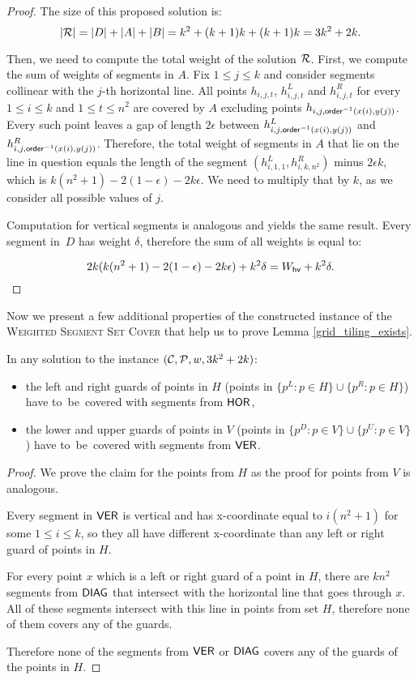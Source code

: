 \begin{proof}
The size of this proposed solution is:
$$|\mathcal{R}| = |D| + |A| + |B| = k^2 + (k+1)k + (k+1)k = 3k^2+2k.$$

Then, we need to compute the total weight of the solution $\mathcal{R}$.
First, we compute the sum of weights of segments in $A$.
Fix $1 \le j \le k$ and consider segments collinear
with the $j$-th horizontal line.
All points $h_{i,j,t}$, $h_{i,j,t}^L$ and $h_{i,j,t}^R$
for every $1 \le i \le k$ and $1 \le t \le n^2$ are covered by $A$
excluding points $h_{i,j,\mathsf{order}^{-1}(x(i),y(j))}$.
Every such point leaves a gap of length $2\epsilon$ between
$h_{i,j,\mathsf{order}^{-1}(x(i),y(j))}^L$ and $h_{i,j,\mathsf{order}^{-1}(x(i),y(j))}^R$.
Therefore, the total weight of segments in $A$
that lie on the line in question equals the length of the segment
$(h_{i,1,1}^L, h_{i,k,n^2}^R)$
minus $2\epsilon k$, which is $k(n^2+1) -2(1-\epsilon)-2k\epsilon$.
We need to multiply that by $k$, as we consider all possible values of $j$.

Computation for vertical segments is analogous and yields the same result.
Every segment in~$D$ has weight $\delta$, therefore the sum of all weights
is equal to:

$$2k(k(n^2+1) -2(1-\epsilon)-2k\epsilon) + k^2\delta= W_{\mathsf{hv}}+k^2\delta.\qedhere$$
\end{proof}

Now we present a few additional properties of the constructed instance
of the \textsc{Weighted} \textsc{Segment} \textsc{Set} \textsc{Cover}
that help us to prove Lemma \ref{grid_tiling_exists}.

\begin{claim}
\label{guards}
In any solution to the instance $(\mathcal{C}, \mathcal{P}, w, 3k^2+2k)$:
\begin{itemize}
\item the left and right guards of points in $H$
(points in $\{p^L : p \in H\} \cup \{p^R : p \in H\}$)
have to~be~covered with segments from $\mathsf{HOR}$,
\item the lower and upper guards of points in $V$
(points in $\{p^D : p \in V\} \cup \{p^U : p \in V\}$)
have to~be~covered with segments from $\mathsf{VER}$.
\end{itemize}
\end{claim}

\begin{proof}
We prove the claim for the points from $H$
as the proof for points from $V$ is analogous.

Every segment in $\mathsf{VER}$ is vertical and 
has x-coordinate equal to $i(n^2+1)$ for some $1\le i \le k$,
so they all have different x-coordinate
than any left or right guard of points in $H$.

For every point $x$ which is a left or right guard of a point in $H$,
there are $kn^2$ segments from $\mathsf{DIAG}$ that intersect with the horizontal
line that goes through $x$. All of these segments intersect with
this line in points from set $H$, therefore none of them
covers any of the guards.

Therefore none of the segments from $\mathsf{VER}$ or $\mathsf{DIAG}$ covers any
of the guards of the points in $H$.
\end{proof}

